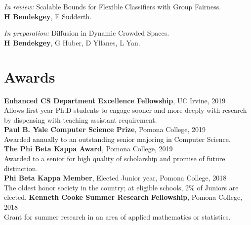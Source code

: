 \documentclass[margin]{res}
\begin{document}
\begin{resume}
\emph{In review:} Scalable Bounds for Flexible Classifiers with Group Fairness. \\\textbf{H Bendekgey}, E Sudderth.

\emph{In preparation:} Diffusion in Dynamic Crowded Spaces. \\\textbf{H Bendekgey}, G Huber, D Yllanes, L Yan.

\section{Awards}
\textbf{Enhanced CS Department Excellence Fellowship}, UC Irvine, 2019\\Allows first-year Ph.D students to engage sooner and more deeply with research by dispensing with teaching assistant requirement.\\
\textbf{Paul B. Yale Computer Science Prize}, Pomona College, 2019\\Awarded annually to an outstanding senior majoring in Computer Science.\\
\textbf{The Phi Beta Kappa Award}, Pomona College, 2019\\Awarded to a senior for high quality of scholarship and promise of future distinction.\\
\textbf{Phi Beta Kappa Member}, Elected Junior year, Pomona College, 2018 \\
The oldest honor society in the country; at eligible schools, 2\% of Juniors are elected.
\textbf{Kenneth Cooke Summer Research Fellowship}, Pomona College, 2018\\Grant for summer research in an area of applied mathematics or statistics.\\

\end{resume}
\end{document}
